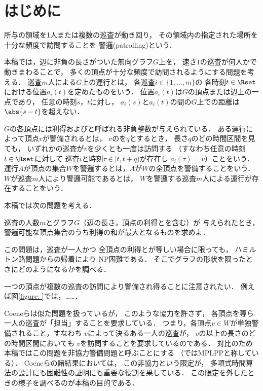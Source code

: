 
\section{はじめに}
所与の領域を1人または複数の巡査が動き回り，
その領域内の指定された場所を十分な頻度で訪問することを
警邏(patrolling)という\cite{chen2013fence, coene2011charlemagne, czyzowicz2011boundary}．


本稿では，辺に非負の長さがついた無向グラフ$G$上を，
速さ$1$の巡査が何人かで動きまわることで，
多くの頂点が十分な頻度で訪問されるようにする問題を考える．
巡査$m$人による$G$上の運行とは，
各巡査$i \in \{1, \ldots, m\}$の
各時刻$t \in \Rset$における位置$a _i (t)$を定めたものをいう．
位置$a _i (t)$は$G$の頂点または辺上の一点であり，
任意の時刻$s$，$t$に対し，
$a _i (s)$と$a _i (t)$の間の$G$上での距離は$\abs{s - t}$を超えない．


$G$の各頂点には利得および{\timelimit}と呼ばれる非負整数が与えられている．
ある運行によって頂点$v$が警備されるとは，
$v$の{\timelimit}を$q$とするとき，
長さ$q$のどの時間区間を見ても，
いずれかの巡査が$v$を少くとも一度は訪問する
（すなわち任意の時刻$t \in \Rset$に対して
巡査$i$と時刻$\tau \in [t, t + q)$が存在し
$a _i (\tau) = v$）ことをいう．
運行$A$が頂点の集合$W$を警邏するとは，$A$が$W$の全頂点を警備することをいう．
$W$が巡査$m$人により警邏可能であるとは，
$W$を警邏する巡査$m$人による運行が存在することをいう．

本稿では次の問題を考える．

\begin{cooperativepatrollingproblem}
	巡査の人数$m$とグラフ$G$（辺の長さ，頂点の利得と{\timelimit}を含む）が
	与えられたとき，
	警邏可能な頂点集合のうち利得の和が最大となるものを求めよ．
\end{cooperativepatrollingproblem}

この問題は，巡査が一人かつ
全頂点の利得と{\timelimit}が等しい場合に限っても，
ハミルトン路問題からの帰着により
NP困難である\cite[Theorem~8]{coene2011charlemagne}．
そこでグラフの形状を限ったときにどのようになるかを調べる．

一つの頂点が複数の巡査の訪問により警備され得ることに注意されたい．
例えば図\ref{figure: }では，……．

Coeneら\cite{coene2011charlemagne}は似た問題を扱っているが，
このような協力を許さず，
各頂点を専ら一人の巡査が「担当」することを要求している．
つまり，各頂点$v \in W$が単独警備されること，すなわち
$v$によって決るある一人の巡査が，
$v$の{\timelimit}以上の長さのどの時間区間においても
$v$を訪問することを要求しているのである．
対比のため本稿ではこの問題を非協力警備問題と呼ぶことにする
（\cite{coene2011charlemagne}ではMPLPPと称している）．
Coeneら\cite{coene2011charlemagne}の諸結果においては，
この非協力という限定が，
多項式時間算法の設計にも困難性の証明にも重要な役割を果している．
この限定を外したときの様子を調べるのが本稿の目的である．

